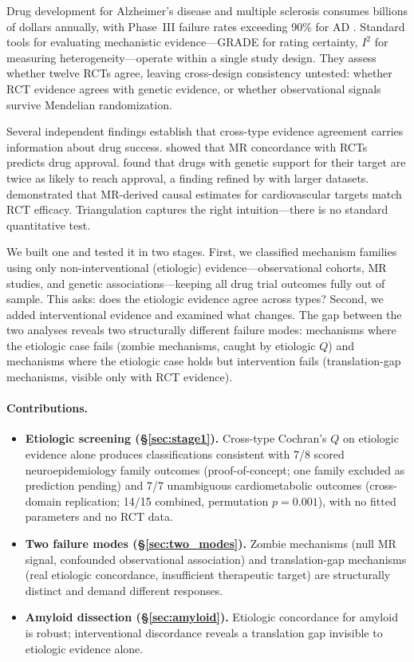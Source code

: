 \documentclass[11pt]{article}
\begin{document}
Drug development for Alzheimer's disease and multiple sclerosis consumes billions of dollars annually, with Phase~III failure rates exceeding 90\% for AD \citep{cummings2014}. Standard tools for evaluating mechanistic evidence---GRADE for rating certainty, $I^2$ for measuring heterogeneity---operate within a single study design. They assess whether twelve RCTs agree, leaving cross-design consistency untested: whether RCT evidence agrees with genetic evidence, or whether observational signals survive Mendelian randomization.

Several independent findings establish that cross-type evidence agreement carries information about drug success. \citet{gill2021} showed that MR concordance with RCTs predicts drug approval. \citet{nelson2015} found that drugs with genetic support for their target are twice as likely to reach approval, a finding refined by \citet{minikel2024} with larger datasets. \citet{ference2019} demonstrated that MR-derived causal estimates for cardiovascular targets match RCT efficacy. Triangulation \citep{lawlor2016} captures the right intuition---there is no standard quantitative test.

We built one and tested it in two stages. First, we classified mechanism families using only non-interventional (etiologic) evidence---observational cohorts, MR studies, and genetic associations---keeping all drug trial outcomes fully out of sample. This asks: does the etiologic evidence agree across types? Second, we added interventional evidence and examined what changes. The gap between the two analyses reveals two structurally different failure modes: mechanisms where the etiologic case fails (zombie mechanisms, caught by etiologic $Q$) and mechanisms where the etiologic case holds but intervention fails (translation-gap mechanisms, visible only with RCT evidence).

\paragraph{Contributions.}
\begin{itemize}
\item \textbf{Etiologic screening (\S\ref{sec:stage1}).} Cross-type Cochran's $Q$ on etiologic evidence alone produces classifications consistent with 7/8 scored neuroepidemiology family outcomes (proof-of-concept; one family excluded as prediction pending) and 7/7 unambiguous cardiometabolic outcomes (cross-domain replication; 14/15 combined, permutation $p = 0.001$), with no fitted parameters and no RCT data.
\item \textbf{Two failure modes (\S\ref{sec:two_modes}).} Zombie mechanisms (null MR signal, confounded observational association) and translation-gap mechanisms (real etiologic concordance, insufficient therapeutic target) are structurally distinct and demand different responses.
\item \textbf{Amyloid dissection (\S\ref{sec:amyloid}).} Etiologic concordance for amyloid is robust; interventional discordance reveals a translation gap invisible to etiologic evidence alone.
\end{itemize}
\end{document}
